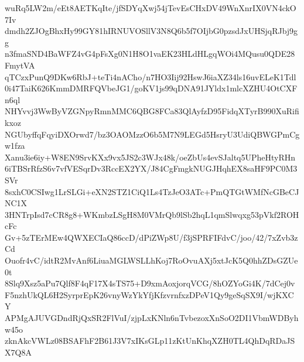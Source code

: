 wuRq5LW2m/eEt8AETKqIte/jfSDYqXwj54jTevEsCHxDV49WnXnrIX0VN4ckO7Iv
dmdh2ZJOgBhxHy99GY81hIRNUVOSllV3N8Q6b5f7OIjbG0pzsdJxUHSjqRJbj9gg
n3fmaSND4BaWFZ4vG4pFsXg0N1H8O1vaEK23HLdHLgqWOi4MQusu0QDE28FmytVA
qTCzxPunQ9DKw6RbJ+teTi4nACho/n7HO3Iij92HswJ6iaXZ34ls16uvELeK1Tdl
0i47TaiK626KmmDMRFQVbeJG1/goKV1js99qDNA91JYldx1mlcXZHU4OtCXFn6ql
NHYvvj3WwByVZGNpyRmnMMC6QBG8FCa83QlAyfzD95FidqXTyrB990XuRifikxoz
NGUbyffqFqyiDXOrwd7/bz3OAOMzzO6b5M7N9LEGd5HsryU3UdiQBWGPmCgw1fza
Xanu3ie6iy+W8EN9SrvKXx9vx5JS2c3WJx48k/oeZbUs4evSJaltq5UPheHtyRHn
6iTBSrRfzS6v7vfVESqrDv3RccEX2YX/J84CgFmgkNUGJHqhEX8saHF9PC0M3SVr
8sxhC0CSIwg1LrSLGi+eXN2STZ1CiQ1Ls4TzJeO3ATc+PmQTGtWMfNcGBeCJNC1X
3HNTrpIsd7cCR8g8+WKmbzLSgH8M0VMrQb9lSb2hqL1qmSlwqxg53pVkf2ROHcFc
Gv+5zTErMEw4QWXECIaQ86ccD/dPiZWp8U/f3jSPRFIFdvC/joo/42/7xZvb3zCd
Ouofr4vC/idtR2MvAnf6LiuaMGLWSLLhKoj7RoOvuAXj5xtJcK5Q0hhZDsGZUe0t
8Slq9Xsz5aPu7Qlf8F4qF17X4sTS75+D9xmAoxjorqVCG/8hOZYoGi4K/7dCej0v
F5nzhUkQL6H2SyrprEpK26vnyWzYkYfjKfzvrnfxzDPeV1Qy9geSqSX9I/wjKXCY
APMgAJUVGDndRjQxSR2FlVuI/zjpLxKNln6nTvbezoxXnSoO2DI1VbmWDByhw45o
zknAkcVWLz08BSAFhF2B61J3V7xIKsGLp11zKtUnKhqXZH0TL4QhDqRDaJSX7Q8A
